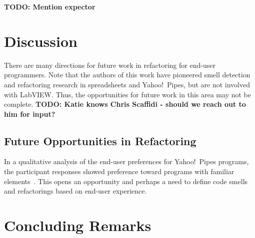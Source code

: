 \documentclass[10pt,conference,compsocconf]{IEEEtran}
\newcommand{\todo}[1]{\textbf{TODO: #1}}
\begin{document}
\todo{Mention expector}

\section{Discussion}
\label{sec:discussion}

There are many directions for future work in refactoring for end-user programmers. Note that the authors of this work have pioneered smell detection and refactoring research in spreadsheets and Yahoo!\ Pipes, but are not involved with LabVIEW. Thus, the opportunities for future work in this area may not be complete.  \todo{Katie knows Chris Scaffidi - should we reach out to him for input?}



\subsection{Future Opportunities in Refactoring}
In a qualitative analysis of the end-user preferences for Yahoo!\ Pipes programs, the participant responses showed preference toward programs with familiar elements~\cite{Stolee2015}. This opens an opportunity and perhaps a need to define code smells and refactorings based on end-user experience. 


\section{Concluding Remarks}
\label{sec:conclusions}

\newpage
\balance





\end{document}
